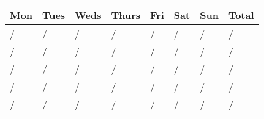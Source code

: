 \documentclass{article}
\begin{document}
\begin{center}
    {\setlength{\extrarowheight}{30pt}%
        \begin{tabularx}{\textwidth}{|X|X|X|X|X|X|X|X|}
                \hline
                Mon & Tues & Weds & Thurs & Fri & Sat & Sun & Total \\
                \hline\hline
                / & /  & / & / & /  & /  & / & \hspace{0.4cm}/ \\
                \hline
                / & /  & / & / & /  & /  & / & \hspace{0.4cm}/ \\
                \hline
                / & /  & / & / & /  & /  & / & \hspace{0.4cm}/ \\
                \hline
                / & /  & / & / & /  & /  & / & \hspace{0.4cm}/ \\
                \hline
                / & /  & / & / & /  & /  & / & \hspace{0.4cm}/ \\
                \hline
        \end{tabularx}}
\end{center}
\end{document}
